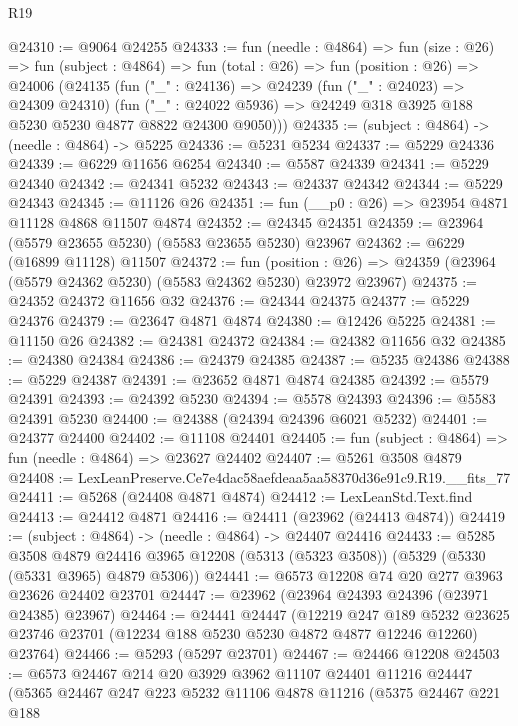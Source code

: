 \begin{lexlean}{R19}
\begin{coremodule}
@24310 := @9064 @24255
@24333 := fun (needle : @4864) =>
  fun (size : @26) =>
  fun (subject : @4864) =>
  fun (total : @26) =>
  fun (position : @26) =>
  @24006
    (@24135
      (fun ("_" : @24136) =>
      @24239
        (fun ("_" : @24023) => @24309 @24310)
        (fun ("_" : @24022 @5936) => @24249 @318 @3925 @188 @5230 @5230 @4877 @8822 @24300 @9050)))
@24335 := (subject : @4864) -> (needle : @4864) -> @5225
@24336 := @5231 @5234
@24337 := @5229 @24336
@24339 := @6229 @11656 @6254
@24340 := @5587 @24339
@24341 := @5229 @24340
@24342 := @24341 @5232
@24343 := @24337 @24342
@24344 := @5229 @24343
@24345 := @11126 @26
@24351 := fun (__p0 : @26) => @23954 @4871 @11128 @4868 @11507 @4874
@24352 := @24345 @24351
@24359 := @23964 (@5579 @23655 @5230) (@5583 @23655 @5230) @23967
@24362 := @6229 (@16899 @11128) @11507
@24372 := fun (position : @26) =>
  @24359 (@23964 (@5579 @24362 @5230) (@5583 @24362 @5230) @23972 @23967)
@24375 := @24352 @24372 @11656 @32
@24376 := @24344 @24375
@24377 := @5229 @24376
@24379 := @23647 @4871 @4874
@24380 := @12426 @5225
@24381 := @11150 @26
@24382 := @24381 @24372
@24384 := @24382 @11656 @32
@24385 := @24380 @24384
@24386 := @24379 @24385
@24387 := @5235 @24386
@24388 := @5229 @24387
@24391 := @23652 @4871 @4874 @24385
@24392 := @5579 @24391
@24393 := @24392 @5230
@24394 := @5578 @24393
@24396 := @5583 @24391 @5230
@24400 := @24388 (@24394 @24396 @6021 @5232)
@24401 := @24377 @24400
@24402 := @11108 @24401
@24405 := fun (subject : @4864) => fun (needle : @4864) => @23627 @24402
@24407 := @5261 @3508 @4879
@24408 := LexLeanPreserve.Ce7e4dac58aefdeaa5aa58370d36e91c9.R19.__fits_77
@24411 := @5268 (@24408 @4871 @4874)
@24412 := LexLeanStd.Text.find
@24413 := @24412 @4871
@24416 := @24411 (@23962 (@24413 @4874))
@24419 := (subject : @4864) -> (needle : @4864) -> @24407 @24416
@24433 := @5285
    @3508
    @4879
    @24416
    @3965
    @12208
    (@5313 (@5323 @3508))
    (@5329 (@5330 (@5331 @3965) @4879 @5306))
@24441 := @6573 @12208 @74 @20 @277 @3963 @23626 @24402 @23701
@24447 := @23962 (@23964 @24393 @24396 (@23971 @24385) @23967)
@24464 := @24441
    @24447
    (@12219
      @247
      @189
      @5232
      @23625
      @23746
      @23701
      (@12234 @188 @5230 @5230 @4872 @4877 @12246 @12260)
      @23764)
@24466 := @5293 (@5297 @23701)
@24467 := @24466 @12208
@24503 := @6573
    @24467
    @214
    @20
    @3929
    @3962
    @11107
    @24401
    @11216
    @24447
    (@5365
      @24467
      @247
      @223
      @5232
      @11106
      @4878
      @11216
      (@5375
        @24467
        @221
        @188

\end{coremodule}
\end{lexlean}
